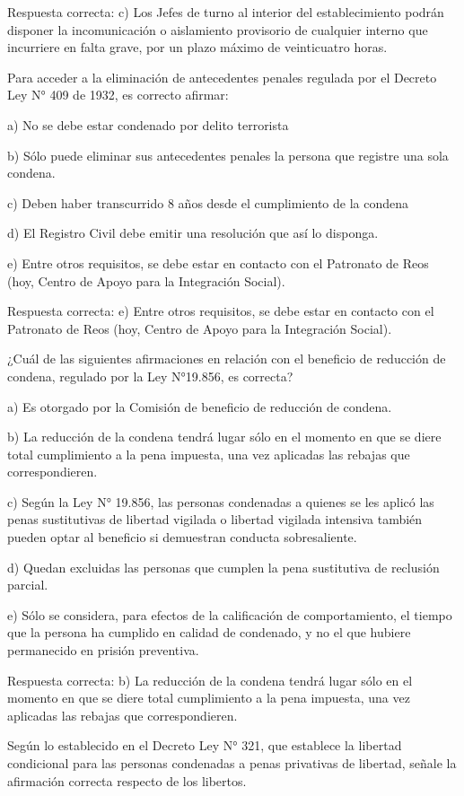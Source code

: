 \documentclass[letterpaper, 11pt]{article}
\begin{document}
Respuesta correcta:
c) Los Jefes de turno al interior del establecimiento podrán
disponer la incomunicación o aislamiento provisorio de cualquier interno que
incurriere en falta grave, por un plazo máximo de veinticuatro horas.


Para acceder a la eliminación de antecedentes penales regulada por el Decreto Ley N°
409 de 1932, es correcto afirmar:

a) No se debe estar condenado por delito terrorista

b) Sólo puede eliminar sus antecedentes penales la persona que registre una sola condena.

c) Deben haber transcurrido 8 años desde el cumplimiento de la condena

d) El Registro Civil debe emitir una resolución que así lo disponga.

e) Entre otros requisitos, se debe estar en contacto con el Patronato de Reos (hoy, Centro
de Apoyo para la Integración Social).

Respuesta correcta:
e) Entre otros requisitos, se debe estar en contacto con el
Patronato de Reos (hoy, Centro de Apoyo para la Integración Social).

¿Cuál de las siguientes afirmaciones en relación con el beneficio de reducción de
condena, regulado por la Ley N°19.856, es correcta?

a) Es otorgado por la Comisión de beneficio de reducción de condena.

b) La reducción de la condena tendrá lugar sólo en el momento en que se diere total
cumplimiento a la pena impuesta, una vez aplicadas las rebajas que correspondieren.

c) Según la Ley N° 19.856, las personas condenadas a quienes se les aplicó las penas
sustitutivas de libertad vigilada o libertad vigilada intensiva también pueden optar al
beneficio si demuestran conducta sobresaliente.

d) Quedan excluidas las personas que cumplen la pena sustitutiva de reclusión parcial.

e) Sólo se considera, para efectos de la calificación de comportamiento, el tiempo que la
persona ha cumplido en calidad de condenado, y no el que hubiere permanecido en prisión
preventiva.

Respuesta correcta: b) La reducción de la condena tendrá lugar sólo en el momento
en que se diere total cumplimiento a la pena impuesta, una vez aplicadas las rebajas
que correspondieren.

Según lo establecido en el Decreto Ley N° 321, que establece la libertad condicional
para las personas condenadas a penas privativas de libertad, señale la afirmación correcta
respecto de los libertos.
\end{document}
